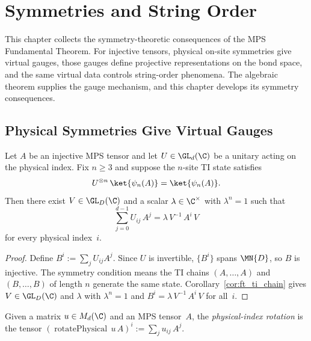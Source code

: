 \chapter{Symmetries and String Order}\label{ch:symmetry}

This chapter collects the symmetry-theoretic consequences of the MPS
Fundamental Theorem. For injective tensors, physical on-site symmetries
give virtual gauges, those gauges define projective
representations on the bond space, and the same virtual data controls
string-order phenomena. The algebraic theorem supplies the gauge
mechanism, and this chapter develops its symmetry consequences.

\section{Physical Symmetries Give Virtual Gauges}

\begin{corollary}%
    \label{cor:symmetry_virtual_gauge}
    \notready
    Let $A$ be an injective MPS tensor and let $U \in \GL_d(\C)$ be a
    unitary acting on the physical index.
    Fix $n \ge 3$ and suppose the $n$-site TI state satisfies
    \[
        U^{\otimes n}\, \ket{\psi_n(A)} = \ket{\psi_n(A)}.
    \]
    Then there exist $V \in \GL_D(\C)$ and a scalar
    $\lambda \in \C^{\times}$ with $\lambda^n = 1$ such that
    \[
        \sum_{j=0}^{d-1} U_{ij}\, A^j
        = \lambda\, V^{-1}\, A^i\, V
    \]
    for every physical index~$i$.
\end{corollary}

\begin{proof}
    Define $B^i := \sum_j U_{ij} A^j$.
    Since $U$ is invertible, $\{B^i\}$ spans $\MN{D}$, so $B$ is
    injective.
    The symmetry condition means the TI chains $(A, \dots, A)$ and
    $(B, \dots, B)$ of length $n$ generate the same state.
    Corollary~\ref{cor:ft_ti_chain} gives $V \in \GL_D(\C)$
    and $\lambda$ with $\lambda^n = 1$ and
    $B^i = \lambda\, V^{-1}\, A^i\, V$ for all~$i$.
\end{proof}

\begin{definition}%
    \label{def:rotate_physical}
    \leanok
    Given a matrix $u \in M_d(\C)$ and an MPS tensor~$A$,
    the \emph{physical-index rotation} is the tensor
    $(\operatorname{rotatePhysical}\, u\, A)^i := \sum_j u_{ij}\, A^j$.
\end{definition}

